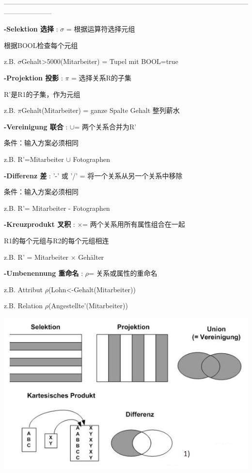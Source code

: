 \documentclass[fleqn]{article}
\begin{document}
\noindent---------------------------------------------------------------------------------------------------------------------------------

\noindent \textbf{-Selektion 选择} : $\sigma$ = 根据运算符选择元组 

根据BOOL检查每个元组

z.B. $\sigma$Gehalt>5000(Mitarbeiter) = Tupel mit BOOL=true

\noindent \textbf{-Projektion 投影} : $\pi$ = 选择关系R的子集

R'是R1的子集，作为元组

z.B. $\pi$Gehalt(Mitarbeiter) = ganze Spalte Gehalt 整列薪水

\noindent \textbf{-Vereinigung 联合} : $\cup$= 两个关系合并为R'

条件：输入方案必须相同

z.B. R'=Mitarbeiter $\cup$ Fotographen

\noindent \textbf{-Differenz 差} : '-' 或 '/' = 将一个关系从另一个关系中移除

条件：输入方案必须相同

z.B. R'= Mitarbeiter - Fotographen

\noindent \textbf{-Kreuzprodukt 叉积} : $\times$= 两个关系用所有属性组合在一起

R1的每个元组与R2的每个元组相连

z.B. R' = Mitarbeiter $\times$ Gehälter

\noindent \textbf{-Umbenennung 重命名} : $\rho$= 关系或属性的重命名

z.B. Attribut $\rho$(Lohn<-Gehalt(Mitarbeiter))

z.B. Relation $\rho$(Angestellte'(Mitarbeiter))

\begin{center}
    \includegraphics[scale=0.5]{19.png}
\end{center}
\end{document}
